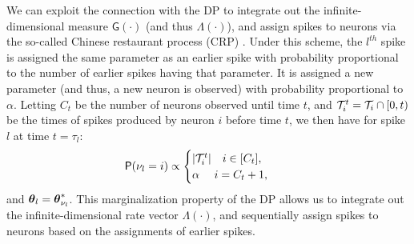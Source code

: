 We can exploit the connection with the DP to %
integrate out the infinite-dimensional measure $\mathsf{G}(\cdot)$ (and thus $\mathsf{\Lambda}(\cdot)$), and assign spikes to neurons via 
the so-called Chinese restaurant process (CRP) \citep{Pit2002a}. Under this scheme, the $l^{th}$ spike is assigned the same parameter as an earlier spike with probability 
proportional to the number of earlier spikes having that parameter. It is assigned a new parameter (and thus, a new neuron is observed) with probability 
proportional to $\alpha$. Letting $C_t$ be the number of neurons observed until time $t$, and  $\mathcal{T}^t_i = \mathcal{T}_i \cap [0,t)$ be the times of spikes 
produced by neuron $i$ before time $t$,
we then have for spike $l$ at time $t = \tau_l$: 
\vspace{-.06in}
\begin{align}
  \mathsf{P}({\nu_l} = i) & \propto 
  \begin{cases}
   |\mathcal{T}^t_i| \quad i \in [C_{t}], \\
   \alpha \quad\ i = C_{t} + 1, 
  \end{cases}  
\label{eq:crp_marg_pr}
\end{align}
and $\boldsymbol{\theta}_l = \boldsymbol{\theta}^*_{\nu_l}$. 
This marginalization property of the DP allows us to integrate out the infinite-dimensional rate vector $\mathsf{\Lambda}(\cdot)$, and sequentially 
assign spikes to neurons based on the assignments of earlier spikes.

